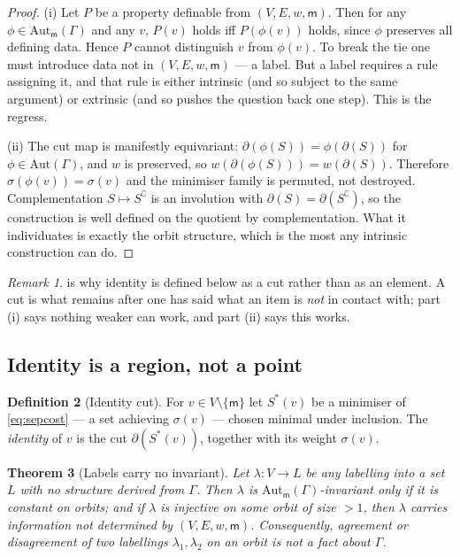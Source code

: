 \documentclass[11pt,twocolumn,a4paper]{article}
\theoremstyle{thmstyle}
\newtheorem{theorem}{Theorem}[section]
\theoremstyle{definition}
\newtheorem{definition}[theorem]{Definition}
\theoremstyle{remark}
\newtheorem{remark}[theorem]{Remark}
\newcommand{\Gph}{\Gamma}
\newcommand{\V}{V}
\newcommand{\E}{E}
\newcommand{\wt}{w}
\newcommand{\med}{\mathsf{m}}
\newcommand{\cut}{\partial}
\newcommand{\co}{\complement}
\newcommand{\str}{\sigma}
\begin{document}
\begin{proof}
(i) Let $P$ be a property definable from $(\V,\E,\wt,\med)$. Then for
any $\phi \in \mathrm{Aut}_\med(\Gph)$ and any $v$, $P(v)$ holds iff
$P(\phi(v))$ holds, since $\phi$ preserves all defining data. Hence
$P$ cannot distinguish $v$ from $\phi(v)$. To break the tie one must
introduce data not in $(\V,\E,\wt,\med)$ --- a label. But a label
requires a rule assigning it, and that rule is either intrinsic (and
so subject to the same argument) or extrinsic (and so pushes the
question back one step). This is the regress.

(ii) The cut map is manifestly equivariant: $\cut(\phi(S)) =
\phi(\cut(S))$ for $\phi \in \mathrm{Aut}(\Gph)$, and $\wt$ is
preserved, so $\wt(\cut(\phi(S))) = \wt(\cut(S))$. Therefore
$\str(\phi(v)) = \str(v)$ and the minimiser family is permuted, not
destroyed. Complementation $S \mapsto S^\co$ is an involution with
$\cut(S) = \cut(S^\co)$, so the construction is well defined on the
quotient by complementation. What it individuates is exactly the orbit
structure, which is the most any intrinsic construction can do.
\end{proof}

\begin{remark}
 is why identity is defined below as a cut rather
than as an element. A cut is what remains after one has said what an
item is \emph{not} in contact with; part (i) says nothing weaker can
work, and part (ii) says this works.
\end{remark}

\subsection{Identity is a region, not a point}

\begin{definition}[Identity cut]
\label{def:identity-cut}
For $v \in \V \setminus \{\med\}$ let $S^{*}(v)$ be a minimiser of
\eqref{eq:sepcost} --- a set achieving $\str(v)$ --- chosen minimal
under inclusion. The \emph{identity} of $v$ is the cut
$\cut(S^{*}(v))$, together with its weight $\str(v)$.
\end{definition}

\begin{theorem}[Labels carry no invariant]
\label{thm:invariant}
Let $\lambda \colon \V \to L$ be any labelling into a set $L$ with no
structure derived from $\Gph$. Then $\lambda$ is
$\mathrm{Aut}_\med(\Gph)$-invariant only if it is constant on orbits;
and if $\lambda$ is injective on some orbit of size $>1$, then
$\lambda$ carries information not determined by $(\V,\E,\wt,\med)$.
Consequently, agreement or disagreement of two labellings
$\lambda_1, \lambda_2$ on an orbit is not a fact about $\Gph$.
\end{theorem}
\end{document}
